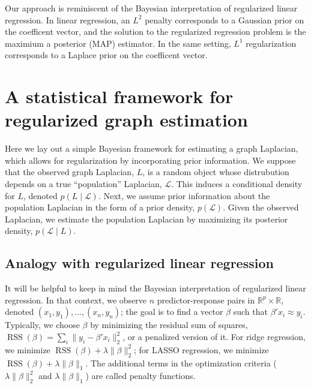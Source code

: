 \documentclass[12pt]{article}
\newcommand{\reals}{\mathbb{R}}
\DeclareMathOperator*{\RSS}{RSS}
\theoremstyle{plain}
\begin{document}
Our approach is reminiscent of the Bayesian interpretation of
regularized linear regression.  In linear regression, an $L^2$ penalty
corresponds to a Gaussian prior on the coefficent vector, and the
solution to the regularized regression problem is the maximium a
posterior (MAP) estimator.  In the same setting, $L^1$ regularization
corresponds to a Laplace prior on the coefficent vector.


\section{A statistical framework for regularized graph estimation}

Here we lay out a simple Bayesian framework for estimating a graph
Laplacian, which allows for regularization by incorporating prior
information.  We suppose that the observed graph Laplacian, $L$, is a
random object whose distrubution depends on a true ``population''
Laplacian, $\mathcal{L}$.  This induces a conditional density for $L$,
denoted $p(L \mid \mathcal{L})$.  Next, we assume prior information
about the population Laplacian in the form of a prior density,
$p(\mathcal{L})$.  Given the observed Laplacian, we estimate the
population Laplacian by maximizing its posterior density,
$p(\mathcal{L} \mid L)$.


\subsection{Analogy with regularized linear regression}\label{S:regression}

It will be helpful to keep in mind the Bayesian
interpretation of regularized linear regression.  In that context, we
observe $n$ predictor-response pairs in $\reals^p \times \reals$,
denoted $(x_1, y_1), \dotsc, (x_n, y_n)$; the goal is to find a vector
$\beta$ such that $\beta' x_i \approx y_i$.  Typically, we choose
$\beta$ by minimizing the residual sum of squares,
$\RSS(\beta) = \sum_i \| y_i - \beta' x_i \|_2^2$, or a
penalized version of it.  For ridge regression, we minimize
$\RSS(\beta) + \lambda \|\beta\|_2^2$; for LASSO regression, we minimize
$\RSS(\beta) + \lambda \|\beta\|_1$.  The additional terms in the
optimization criteria ($\lambda \|\beta\|_2^2$ and $\lambda
\|\beta\|_1$) are called penalty functions.
\end{document}
